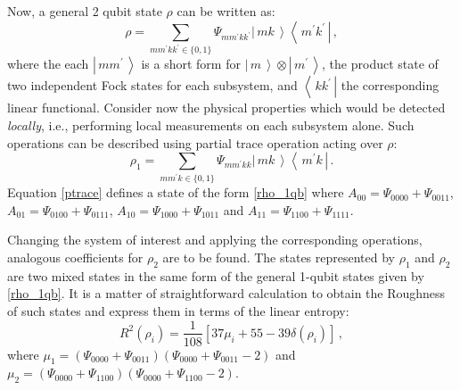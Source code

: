 \documentclass[aps,prl,preprint]{revtex4-1}
\newcommand{\bra}[1]{\ensuremath{\left\langle\, #1\,\right|}}
\newcommand{\ket}[1]{\ensuremath{\left|\,#1\,\right\rangle}}
\begin{document}
	
	Now, a general 2 qubit state $\rho$ can be written as:
	\begin{equation}
	\rho = \sum_{mm^{\prime}kk^{\prime}\in\{0,1\}} 
	\Psi_{mm^{\prime}kk^{\prime}}\ket{mk}\bra{m^{\prime}k^{\prime}}\, ,  \label{2qb}
	\end{equation}
	where the each $\ket{mm^{\prime}}$ is a short form for $\ket{m}\otimes\ket{m^{\prime}}$, the product
	state of two independent Fock states for each subsystem, and $\bra{kk^{\prime}}$ the
	corresponding linear functional.
	Consider now the physical properties  which 
	would be detected \emph{locally}, i.e., performing local measurements on
	each subsystem alone. Such operations can  be
	described using partial trace operation acting over $\rho$:
	\begin{equation}
	\rho_1 = \sum_{mm^{\prime}k\in\{0,1\}} \Psi_{mm^{\prime}kk}\ket{mk}\bra{m^{\prime}k}\, .  \label{ptrace}
	\end{equation}
	Equation \eqref{ptrace} defines a state of the form \eqref{rho_1qb} where 
	$A_{00} = \Psi_{0000} + \Psi_{0011}$, 
	$A_{01} = \Psi_{0100} + \Psi_{0111}$, 
	$A_{10} = \Psi_{1000} + \Psi_{1011}$ and  
	$A_{11} = \Psi_{1100} + \Psi_{1111}$.
	
	Changing the system of interest and applying the corresponding operations, 
	analogous coefficients for $\rho_2$ are to be found.
	The states represented by $\rho_1$ and $\rho_2$ are two mixed states in the same form
	of the general 1-qubit states given  by \eqref{rho_1qb}. It is a matter of
	straightforward
	calculation  to obtain the Roughness of such states and express them in
	terms  of the linear entropy:
	\begin{equation}
	R^2(\rho_i) = \frac{1}{108}\left[37 \mu_i + 55 - 39\delta(\rho_i)\right]  \label{R2rhoA}\,, \end{equation}
	where $\mu_1= (\Psi_{0000} + \Psi_{0011})(\Psi_{0000} +
	\Psi_{0011}-2)$ and  $\mu_2= (\Psi_{0000} + \Psi_{1100})(\Psi_{0000} +
	\Psi_{1100}-2)$.
	
\end{document}
